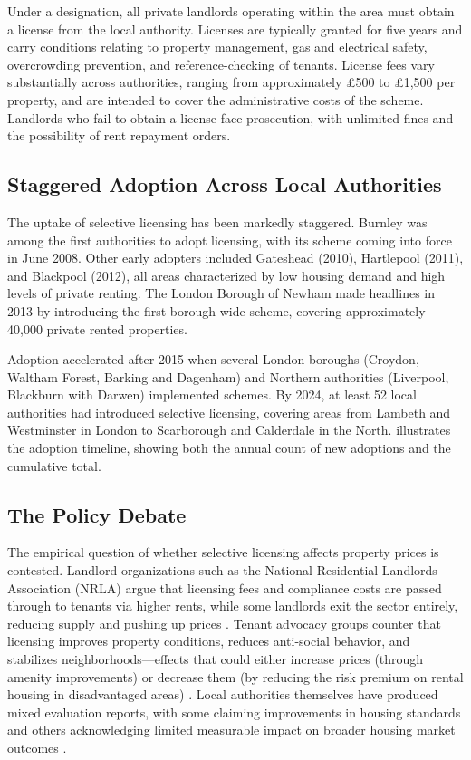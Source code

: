 \documentclass[12pt]{article}
\begin{document}
Under a designation, all private landlords operating within the area must obtain a license from the local authority. Licenses are typically granted for five years and carry conditions relating to property management, gas and electrical safety, overcrowding prevention, and reference-checking of tenants. License fees vary substantially across authorities, ranging from approximately \pounds 500 to \pounds 1,500 per property, and are intended to cover the administrative costs of the scheme. Landlords who fail to obtain a license face prosecution, with unlimited fines and the possibility of rent repayment orders.

\subsection{Staggered Adoption Across Local Authorities}

The uptake of selective licensing has been markedly staggered. Burnley was among the first authorities to adopt licensing, with its scheme coming into force in June 2008. Other early adopters included Gateshead (2010), Hartlepool (2011), and Blackpool (2012), all areas characterized by low housing demand and high levels of private renting. The London Borough of Newham made headlines in 2013 by introducing the first borough-wide scheme, covering approximately 40,000 private rented properties.

Adoption accelerated after 2015 when several London boroughs (Croydon, Waltham Forest, Barking and Dagenham) and Northern authorities (Liverpool, Blackburn with Darwen) implemented schemes. By 2024, at least 52 local authorities had introduced selective licensing, covering areas from Lambeth and Westminster in London to Scarborough and Calderdale in the North.  illustrates the adoption timeline, showing both the annual count of new adoptions and the cumulative total.

\subsection{The Policy Debate}

The empirical question of whether selective licensing affects property prices is contested. Landlord organizations such as the National Residential Landlords Association (NRLA) argue that licensing fees and compliance costs are passed through to tenants via higher rents, while some landlords exit the sector entirely, reducing supply and pushing up prices \citep{nrla2021licensing}. Tenant advocacy groups counter that licensing improves property conditions, reduces anti-social behavior, and stabilizes neighborhoods---effects that could either increase prices (through amenity improvements) or decrease them (by reducing the risk premium on rental housing in disadvantaged areas) \citep{shelter2022licensing}. Local authorities themselves have produced mixed evaluation reports, with some claiming improvements in housing standards and others acknowledging limited measurable impact on broader housing market outcomes \citep{newham2018evaluation}.
\end{document}
